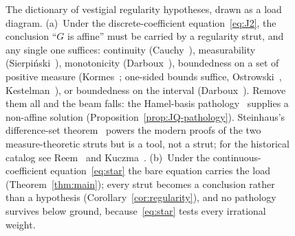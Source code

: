 \documentclass{article}
\theoremstyle{plain}
\theoremstyle{definition}
\begin{document}
\begin{figure}[ht]
{\begin{tikzpicture}[x=1cm,y=1cm]
\end{tikzpicture}%
}
\caption{The dictionary of vestigial regularity hypotheses, drawn as a
load diagram. (a)~Under the discrete-coefficient
equation~\eqref{eq:J2}, the conclusion ``$G$ is affine'' must be
carried by a regularity strut, and any single one suffices: continuity
(Cauchy~\cite{Cauchy1821}), measurability
(Sierpi\'nski~\cite{Sierpinski1920}), monotonicity
(Darboux~\cite{Darboux1875}), boundedness on a set of positive measure
(Kormes~\cite{Kormes1926}; one-sided bounds suffice,
Ostrowski~\cite{Ostrowski1929}, Kestelman~\cite{Kestelman1947}), or
boundedness on the interval (Darboux~\cite{Darboux1880}). Remove them
all and the beam falls: the Hamel-basis pathology~\cite{Hamel1905}
supplies a non-affine solution (Proposition~\ref{prop:JQ-pathology}).
Steinhaus's difference-set theorem~\cite{Steinhaus1920} powers the
modern proofs of the two measure-theoretic struts but is a tool, not a
strut; for the historical catalog see Reem~\cite{Reem2017} and
Kuczma~\cite[\S13.2]{Kuczma2009}. (b)~Under the continuous-coefficient
equation~\eqref{eq:star} the bare equation carries the load
(Theorem~\ref{thm:main}); every strut becomes a conclusion rather than
a hypothesis (Corollary~\ref{cor:regularity}), and no pathology
survives below ground, because~\eqref{eq:star} tests every irrational
weight.}
\label{fig:dictionary}
\end{figure}
\end{document}
